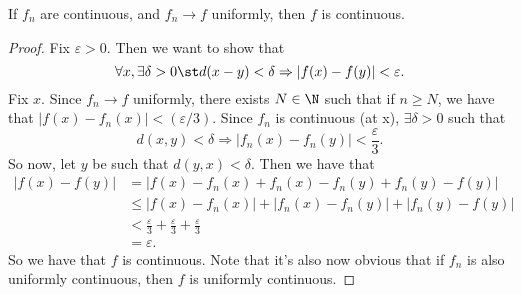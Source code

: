 \documentclass{notes}
\begin{document}
\begin{theorem}
  If $f_n$ are continuous, and $f_n \to f$ uniformly, then $f$ is continuous.
\end{theorem}
\begin{proof}
  Fix $\varepsilon > 0$. Then we want to show that 
  $$\forall x, \exists \delta > 0 \st d(x - y) < \delta \Rightarrow |f(x) - f(y)| < \varepsilon.$$
  Fix $x$. Since $f_n\to f$ uniformly, there exists $N\in\N$ such that if $n\geq N$, we have that 
  $|f(x) - f_n(x)| < (\varepsilon / 3)$. Since $f_n$ is continuous (at x), $\exists \delta > 0$ such
  that $$d(x,y) < \delta \Rightarrow |f_n(x) - f_n(y)| < \frac{\varepsilon}{3}.$$ So now, let $y$ be 
  such that $d(y,x) < \delta$. Then we have that 
  \begin{align*}
    |f(x) - f(y)| &= |f(x) - f_n(x) + f_n(x) - f_n(y) + f_n(y) - f(y)| \\
                  &\leq |f(x) - f_n(x)| + |f_n(x) - f_n(y)| + |f_n(y) - f(y)| \\ 
                  &< \frac{\varepsilon}{3} + \frac{\varepsilon}{3} + \frac{\varepsilon}{3} \\
                  &= \varepsilon.
  \end{align*}
  So we have that $f$ is continuous. Note that it's also now obvious that if $f_n$ is also uniformly 
  continuous, then $f$ is uniformly continuous.
\end{proof}
\end{document}
